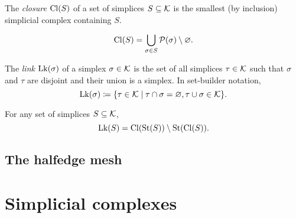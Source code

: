 \begin{definition}\label{def:closure}
    The \emph{closure} $\operatorname{Cl}(S)$ of a set of simplices $S \subseteq \mathcal{K}$ is the smallest (by inclusion) simplicial complex containing $S$.
\end{definition}

\begin{lemma}\label{lem:closure_eq_down_closure}
    \[ \operatorname{Cl}(S) = \bigcup_{\sigma \in S} \mathcal{P}(\sigma) \setminus \varnothing. \] %
\end{lemma}

\begin{definition}\label{def:link}
    The \emph{link} $\operatorname{Lk}(\sigma)$ of a simplex $\sigma \in \mathcal{K}$ is the set of all simplices $\tau \in \mathcal{K}$ such that $\sigma$ and $\tau$ are disjoint and their union is a simplex. In set-builder notation,
    \[ \operatorname{Lk}(\sigma) \coloneqq \{ \tau \in \mathcal{K} \mid \tau \cap \sigma = \varnothing, \tau \cup \sigma \in \mathcal{K} \}. \]
\end{definition}

\begin{lemma}\label{lem:lk_eq_cl_st_sub_st_cl}
    For any set of simplices $S \subseteq \mathcal{K}$, 
    \[ \operatorname{Lk}(S) = \operatorname{Cl}(\operatorname{St}(S)) \setminus \operatorname{St}(\operatorname{Cl}(S)). \]
\end{lemma}

\subsection{The halfedge mesh}
\label{ssec:halfedge_mesh}



\section{Simplicial complexes}
\label{sec:simplicial_complex}

